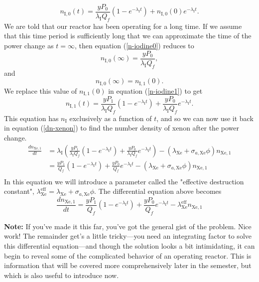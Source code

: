 \documentclass{report}
\begin{document}
\begin{equation}
\label{n-iodine0}
n_{\text{I},0}(t) = \frac{y P_0}{\lambda_{\text{I}}Q_f}\left(1-e^{-\lambda_{\text{I}}t}\right) + n_{\text{I},0}(0)e^{-\lambda_{\text{I}}t}.
\end{equation}
We are told that our reactor has been operating for a long time. If we assume that this time period is sufficiently long that we can approximate the time of the power change as $t=\infty$, then equation (\ref{n-iodine0}) reduces to
$$ n_{\text{I},0}(\infty) = \frac{y P_0}{\lambda_{\text{I}}Q_f} ,$$
and
$$ n_{\text{I},0}(\infty) = n_{\text{I},1}(0) .$$
We replace this value of $n_{\text{I},1}(0)$ in equation (\ref{n-iodine1}) to get
\begin{equation}
\label{n-iodine1-comp}
n_{\text{I},1}(t) = \frac{y P_1}{\lambda_{\text{I}}Q_f}\left(1-e^{-\lambda_{\text{I}}t}\right) + \frac{y P_0}{\lambda_{\text{I}}Q_f}e^{-\lambda_{\text{I}}t}.
\end{equation}
This equation has $n_{\text{I}}$ exclusively as a function of $t$, and so we can now use it back in equation (\ref{dn-xenon}) to find the number density of xenon after the power change. 
\begin{align*}
\frac{dn_{\text{Xe},1}}{dt}	&= \lambda_{\text{I}}\left(\frac{y P_1}{\lambda_{\text{I}}Q_f}\left(1-e^{-\lambda_{\text{I}}t}\right) + \frac{y P_0}{\lambda_{\text{I}}Q_f}e^{-\lambda_{\text{I}}t}\right) - (\lambda_{\text{Xe}} + \sigma_{a,\text{Xe}}\phi) n_{\text{Xe},1} \\
							&= \frac{y P_1}{Q_f}\left(1-e^{-\lambda_{\text{I}}t}\right) + \frac{y P_0}{Q_f}e^{-\lambda_{\text{I}}t} - (\lambda_{\text{Xe}} + \sigma_{a,\text{Xe}}\phi) n_{\text{Xe},1}\\
\end{align*}
In this equation we will introduce a parameter called the "effective destruction constant", $\lambda_{\text{Xe}}^{\text{eff}} = \lambda_{\text{Xe}} + \sigma_{a,\text{Xe}} \phi. $ The differential equation above becomes
$$ \frac{dn_{\text{Xe},1}}{dt} = \frac{y P_1}{Q_f}\left(1-e^{-\lambda_{\text{I}}t}\right) + \frac{y P_0}{Q_f}e^{-\lambda_{\text{I}}t} - \lambda_{\text{Xe}}^{\text{eff}} n_{\text{Xe},1} $$

\textbf{Note:} If you've made it this far, you've got the general gist of the problem. Nice work! The remainder get's a little tricky---you need an integrating factor to solve this differential equation---and though the solution looks a bit intimidating, it can begin to reveal some of the complicated behavior of an operating reactor. This is information that will be covered more comprehensively later in the semester, but which is also useful to introduce now. 
\end{document}
